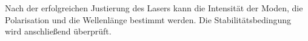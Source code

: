 Nach der erfolgreichen Justierung des Lasers kann die Intensität der Moden, die Polarisation und die Wellenlänge bestimmt werden. Die Stabilitätsbedingung wird anschließend überprüft.

\clearpage

\clearpage

\clearpage

